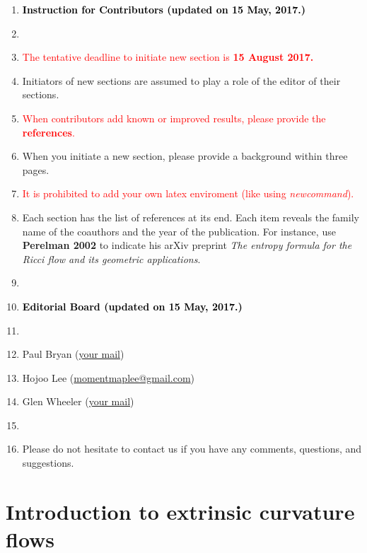 \documentclass{amsart}
\theoremstyle{definition}
\begin{document}
\begin{enumerate}
\item[] \textbf{\textcolor{black}{Instruction for Contributors (updated on 15 May, 2017.)}}
\item[]
\item {\textcolor{red}{The tentative deadline to initiate new section is \textbf{15 August 2017.}}}
\item Initiators of new sections are assumed to play a role of the editor of their sections.
\item \textcolor{red}{When contributors add known or improved results, please provide the \textbf{references}.} 
\item When you initiate a new section, please provide a background within three pages. 
\item  {\textcolor{red}{It is prohibited to add your own latex enviroment (like using \textit{newcommand}).}} 
\item Each section has the list of references at its end. Each item reveals the family name of the coauthors and the year of the publication.
For instance, use \textbf{Perelman 2002} to indicate his arXiv preprint \emph{The entropy formula for the Ricci flow and its geometric applications}.
\item[]
\item[] \textbf{\textcolor{black}{Editorial Board (updated on 15 May, 2017.)}}
\item[]
\item[] Paul Bryan  (\href{your mail}{your mail}) 
\item[] Hojoo Lee  (\href{momentmaplee@gmail.com}{momentmaplee@gmail.com}) 
\item[] Glen Wheeler  (\href{your mail}{your mail}) 
\item[]
\item[] Please do not hesitate to contact us if you have any comments, questions, and suggestions. 
\end{enumerate}

\section{Introduction to extrinsic curvature flows}
  
\newpage 
\end{document}
